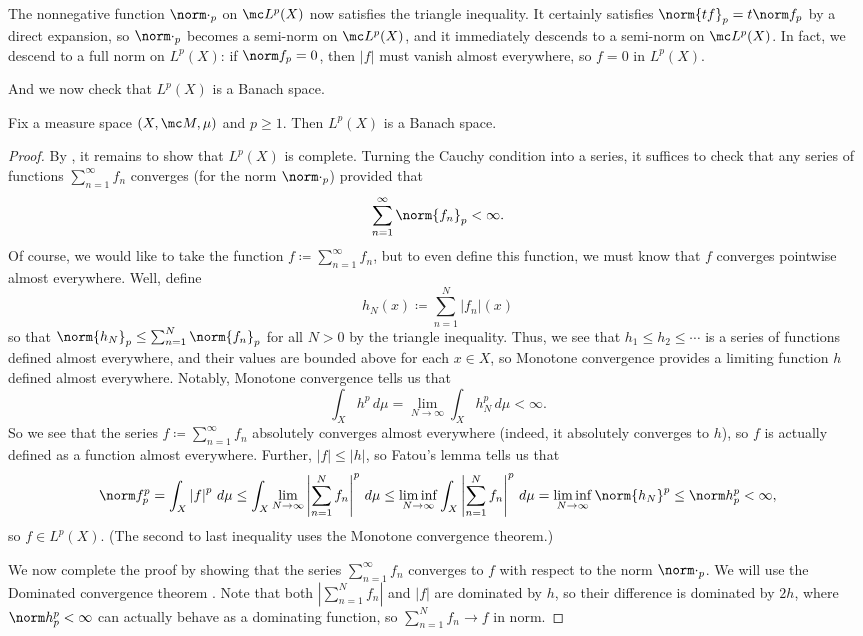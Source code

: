 \documentclass[../notes.tex]{subfiles}
\begin{document}
\begin{remark} \label{rem:lp-norm}
	The nonnegative function $\norm\cdot_p$ on $\mc L^p(X)$ now satisfies the triangle inequality. It certainly satisfies $\norm{tf}_p=t\norm f_p$ by a direct expansion, so $\norm\cdot_p$ becomes a semi-norm on $\mc L^p(X)$, and it immediately descends to a semi-norm on $\mc L^p(X)$. In fact, we descend to a full norm on $L^p(X)$: if $\norm f_p=0$, then $\left|f\right|$ must vanish almost everywhere, so $f=0$ in $L^p(X)$.
\end{remark}
And we now check that $L^p(X)$ is a Banach space.
\begin{theorem} \label{thm:lp-banach}
	Fix a measure space $(X,\mc M,\mu)$ and $p\ge1$. Then $L^p(X)$ is a Banach space.
\end{theorem}
\begin{proof}
	By , it remains to show that $L^p(X)$ is complete. Turning the Cauchy condition into a series, it suffices to check that any series of functions $\sum_{n=1}^\infty f_n$ converges (for the norm $\norm\cdot_p$) provided that
	\[\sum_{n=1}^\infty\norm{f_n}_p<\infty.\]
	Of course, we would like to take the function $f\coloneqq\sum_{n=1}^\infty f_n$, but to even define this function, we must know that $f$ converges pointwise almost everywhere. Well, define
	\[h_N(x)\coloneqq\sum_{n=1}^N\left|f_n\right|(x)\]
	so that $\norm{h_N}_p\le\sum_{n=1}^N\norm{f_n}_p$ for all $N>0$ by the triangle inequality. Thus, we see that $h_1\le h_2\le\cdots$ is a series of functions defined almost everywhere, and their values are bounded above for each $x\in X$, so Monotone convergence provides a limiting function $h$ defined almost everywhere. Notably, Monotone convergence tells us that
	\[\int_Xh^p\,d\mu=\lim_{N\to\infty}\int_Xh_N^p\,d\mu<\infty.\]
	So we see that the series $f\coloneqq\sum_{n=1}^\infty f_n$ absolutely converges almost everywhere (indeed, it absolutely converges to $h$), so $f$ is actually defined as a function almost everywhere. Further, $\left|f\right|\le\left|h\right|$, so Fatou's lemma \cite[Lemma~9.39]{elber-top} tells us that
	\[\norm f_p^p=\int_X\left|f\right|^p\,d\mu\le\int_X\lim_{N\to\infty}\left|\sum_{n=1}^Nf_n\right|^p\,d\mu\le\liminf_{N\to\infty}\int_X\left|\sum_{n=1}^Nf_n\right|^p\,d\mu=\liminf_{N\to\infty}\norm{h_N}^p\le\norm h_p^p<\infty,\]
	so $f\in L^p(X)$. (The second to last inequality uses the Monotone convergence theorem.)

	We now complete the proof by showing that the series $\sum_{n=1}^\infty f_n$ converges to $f$ with respect to the norm $\norm\cdot_p$. We will use the Dominated convergence theorem \cite[Theorem~9.14]{elber-top}. Note that both $\left|\sum_{n=1}^Nf_n\right|$ and $\left|f\right|$ are dominated by $h$, so their difference is dominated by $2h$, where $\norm h_p^p<\infty$ can actually behave as a dominating function, so $\sum_{n=1}^Nf_n\to f$ in norm.
\end{proof}
\end{document}

